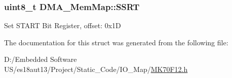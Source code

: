 \subsubsection[{S\+S\+R\+T}]{\setlength{\rightskip}{0pt plus 5cm}uint8\+\_\+t D\+M\+A\+\_\+\+Mem\+Map\+::\+S\+S\+R\+T}\label{struct_d_m_a___mem_map_a39ea12b8e20431f54f8c6ba9f08bfc1b}
Set S\+T\+A\+R\+T Bit Register, offset\+: 0x1\+D 

The documentation for this struct was generated from the following file\+:\begin{DoxyCompactItemize}
\item 
D\+:/\+Embedded Software U\+S/es18aut13/\+Project/\+Static\+\_\+\+Code/\+I\+O\+\_\+\+Map/\hyperlink{_m_k70_f12_8h}{M\+K70\+F12.\+h}\end{DoxyCompactItemize}
